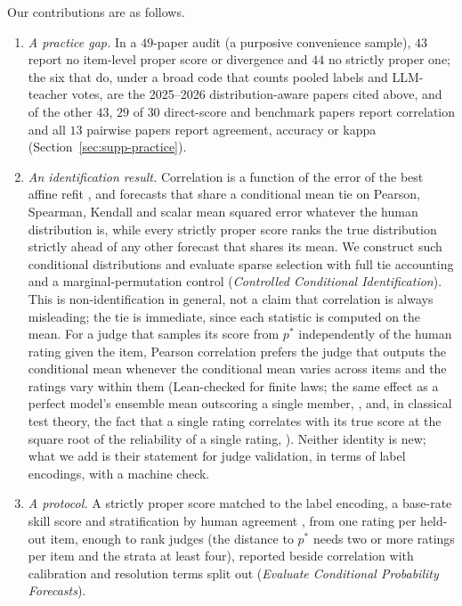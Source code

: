 Our contributions are as follows.
\begin{enumerate}
\item \emph{A practice gap.} In a $49$-paper audit (a purposive convenience sample), $43$ report no item-level proper score or divergence and $44$ no strictly proper one; the six that do, under a broad code that counts pooled labels and LLM-teacher votes, are the 2025--2026 distribution-aware papers cited above, and of the other $43$, $29$ of $30$ direct-score and benchmark papers report correlation and all $13$ pairwise papers report agreement, accuracy or kappa\ifsupplementary{} (Section~\ref{sec:supp-practice})\fi.
\item \emph{An identification result.} Correlation is a function of the error of the best affine refit \citep[a classical decomposition;][]{murphy1988skill}, and forecasts that share a conditional mean tie on Pearson, Spearman, Kendall and scalar mean squared error whatever the human distribution is, while every strictly proper score ranks the true distribution strictly ahead of any other forecast that shares its mean. We construct such conditional distributions and evaluate sparse selection with full tie accounting and a marginal-permutation control (\emph{Controlled Conditional Identification}). This is non-identification in general, not a claim that correlation is always misleading; the tie is immediate, since each statistic is computed on the mean. For a judge that samples its score from $p^*$ independently of the human rating given the item, Pearson correlation prefers the judge that outputs the conditional mean whenever the conditional mean varies across items and the ratings vary within them (Lean-checked for finite laws; the same effect as a perfect model's ensemble mean outscoring a single member, \citealp{kumar2000analysis}, and, in classical test theory, the fact that a single rating correlates with its true score at the square root of the reliability of a single rating, \citealp{lord1968statistical}). Neither identity is new; what we add is their statement for judge validation, in terms of label encodings, with a machine check.
\item \emph{A protocol.} A strictly proper score matched to the label encoding, a base-rate skill score and stratification by human agreement \citep{elangovan2025beyond}, from one rating per held-out item, enough to rank judges (the distance to $p^*$ needs two or more ratings per item and the strata at least four), reported beside correlation with calibration and resolution terms split out (\emph{Evaluate Conditional Probability Forecasts}).

\end{enumerate}
